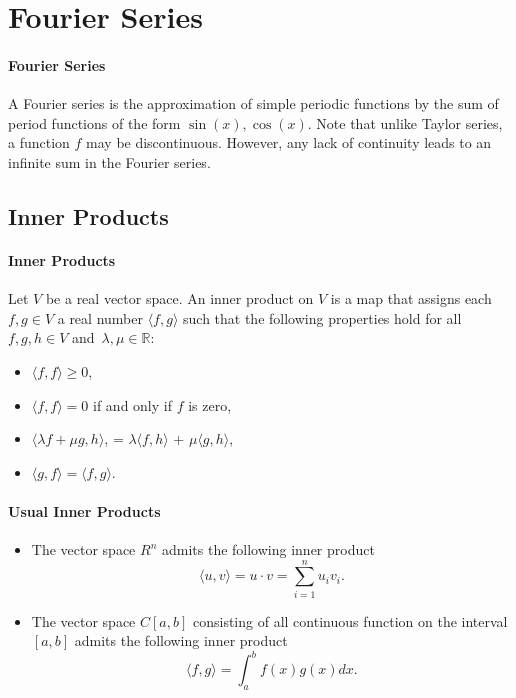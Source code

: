 \section{Fourier Series}
\paragraph{Fourier Series}
A Fourier series is the approximation of simple periodic functions by
the sum of period functions of the form \(\sin(x), \cos(x)\).
Note that unlike Taylor series, a function \(f\) may be discontinuous.
However, any lack of continuity leads to an infinite sum in the Fourier series.

\subsection{Inner Products}
\paragraph{Inner Products}
Let \(V\) be a real vector space. An inner product on \(V\) is a map
that assigns each \(f,g\in V\) a real number \(\langle f, g \rangle\)
such that the following properties hold for all \(f, g, h \in V\) and\
\(\lambda, \mu \in \mathbb{R}\):
\begin{itemize}
    \item \(\langle f, f \rangle \geq 0\),
    \item \(\langle f, f \rangle = 0\) if and only if \(f\) is zero,
    \item \(\langle \lambda f + \mu g, h\rangle\),
    = \(\lambda\langle f, h\rangle\) + \(\mu\langle g, h\rangle\),
    \item \(\langle g, f \rangle = \langle f, g \rangle\).
\end{itemize}

\paragraph{Usual Inner Products}
\begin{itemize}
    \item The vector space \(R^n\) admits the following inner product
    \[ 
        \langle u, v \rangle = u\cdot v = \sum_{i=1}^n u_i v_i.
    \]
    \item The vector space \(C[a, b]\) consisting of all continuous
    function on the interval \([a, b]\) admits the following inner product
    \[
        \langle f, g \rangle = \int_{a}^{b} f(x) g(x) dx.
    \]
\end{itemize}

